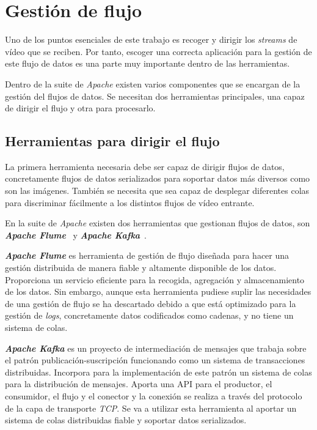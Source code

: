 
\section{Gestión de flujo}	

Uno de los puntos  esenciales de este trabajo es recoger y dirigir los \textit{streams} de vídeo que se reciben. Por tanto, escoger una correcta aplicación para la gestión de este flujo de datos es una parte muy importante dentro de las herramientas.

Dentro de la suite de \textit{Apache} existen varios componentes que se encargan de la gestión del flujos de datos. Se necesitan dos herramientas principales, una capaz de dirigir el flujo y otra para procesarlo.

\subsection{Herramientas para dirigir el flujo}
La primera herramienta necesaria debe ser capaz de dirigir flujos de datos, concretamente flujos de datos serializados para soportar datos más diversos como son las imágenes. También se necesita que sea capaz de desplegar diferentes colas para discriminar fácilmente a los distintos flujos de vídeo entrante.

En la suite de \textit{Apache} existen dos herramientas que gestionan flujos de datos, son \textit{\textbf{Apache Flume}}~\cite{noauthorapacheflume} y \textit{\textbf{Apache Kafka}}~\cite{noauthorapachenodate}.

\textit{\textbf{Apache Flume}} es herramienta de gestión de flujo diseñada para hacer una gestión distribuida de manera fiable y altamente disponible de los datos. Proporciona un servicio eficiente para la recogida, agregación y almacenamiento de los datos. Sin embargo, aunque esta herramienta pudiese suplir las necesidades de una gestión de flujo se ha descartado debido a que está optimizado para la gestión de \textit{logs}, concretamente datos codificados como cadenas, y no tiene un sistema de colas.

\textit{\textbf{Apache Kafka}} es un proyecto de intermediación de mensajes que trabaja sobre el patrón publicación-suscripción funcionando como un sistema de transacciones distribuidas. Incorpora para la implementación de este patrón un sistema de colas para la distribución de mensajes. Aporta una API para el productor, el consumidor, el flujo y el conector y la conexión se realiza a través del protocolo de la capa de transporte \textit{TCP}. Se va a utilizar esta herramienta al aportar un sistema de colas distribuidas fiable y soportar datos serializados.

